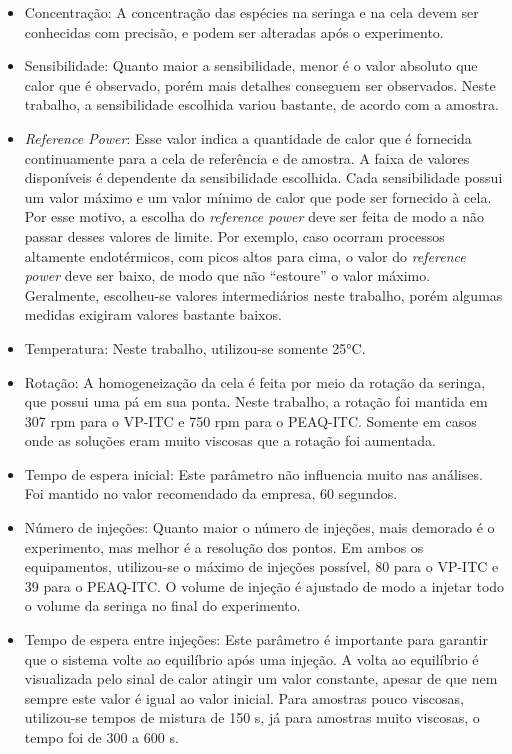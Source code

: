 		\begin{itemize}
			
			\item Concentração: A concentração das espécies na seringa e na cela devem ser conhecidas com precisão, e podem ser alteradas após o experimento.
			
			\item Sensibilidade: Quanto maior a sensibilidade, menor é o valor absoluto que calor que é observado, porém mais detalhes conseguem ser observados. Neste trabalho, a sensibilidade escolhida variou bastante, de acordo com a amostra.
			
			\item \emph{Reference Power}: Esse valor indica a quantidade de calor que é fornecida continuamente para a cela de referência e de amostra. A faixa de valores disponíveis é dependente da sensibilidade escolhida. Cada sensibilidade possui um valor máximo e um valor mínimo de calor que pode ser fornecido à cela. Por esse motivo, a escolha do \emph{reference power} deve ser feita de modo a não passar desses valores de limite. Por exemplo, caso ocorram processos altamente endotérmicos, com picos altos para cima, o valor do \emph{reference power} deve ser baixo, de modo que não ``estoure'' o valor máximo. Geralmente, escolheu-se valores intermediários neste trabalho, porém algumas medidas exigiram valores bastante baixos. %
			
			\item Temperatura: Neste trabalho, utilizou-se somente 25°C.
				
			\item Rotação: A homogeneização da cela é feita por meio da rotação da seringa, que possui uma pá em sua ponta. Neste trabalho, a rotação foi mantida em 307 rpm para o VP-ITC e 750 rpm para o PEAQ-ITC. Somente em casos onde as soluções eram muito viscosas que a rotação foi aumentada.
			
			\item Tempo de espera inicial: Este parâmetro não influencia muito nas análises. Foi mantido no valor recomendado da empresa, 60 segundos.
			
			\item Número de injeções: Quanto maior o número de injeções, mais demorado é o experimento, mas melhor é a resolução dos pontos. Em ambos os equipamentos, utilizou-se o máximo de injeções possível, 80 para o VP-ITC e 39 para o PEAQ-ITC. O volume de injeção é ajustado de modo a injetar todo o volume da seringa no final do experimento.
			
			\item Tempo de espera entre injeções: Este parâmetro é importante para garantir que o sistema volte ao equilíbrio após uma injeção. A volta ao equilíbrio é visualizada pelo sinal de calor atingir um valor constante, apesar de que nem sempre este valor é igual ao valor inicial. Para amostras pouco viscosas, utilizou-se tempos de mistura de 150 s, já para amostras muito viscosas, o tempo foi de 300 a 600 s.
		\end{itemize}
		
